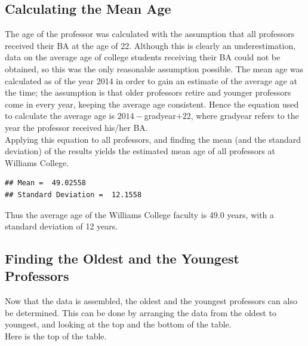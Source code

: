 \documentclass{article}\usepackage[]{graphicx}\usepackage[]{color}
\makeatletter
\newenvironment{kframe}{%
 \def\at@end@of@kframe{}%
 \ifinner\ifhmode%
  \def\at@end@of@kframe{\end{minipage}}%
  \begin{minipage}{\columnwidth}%
 \fi\fi%
 \def\FrameCommand##1{\hskip\@totalleftmargin \hskip-\fboxsep
 \colorbox{shadecolor}{##1}\hskip-\fboxsep
     \hskip-\linewidth \hskip-\@totalleftmargin \hskip\columnwidth}%
 \MakeFramed {\advance\hsize-\width
   \@totalleftmargin\z@ \linewidth\hsize
   \@setminipage}}%
 {\par\unskip\endMakeFramed%
 \at@end@of@kframe}
\newenvironment{knitrout}{}{} %
\makeatother
\begin{document}
\subsection{Calculating the Mean Age}
The age of the professor was calculated with the assumption that all professors received their BA at the
age of 22. Although this is clearly an underestimation, data on the average age of college students receiving
their BA could not be obtained, so this was the only reasonable assumption possible. The mean age was
calculated as of the year 2014 in order to gain an estimate of the average age at the time; the assumption
is that older professors retire and younger professors come in every year, keeping the average age consistent.
Hence the equation used to calculate the average age is $2014 - $gradyear$ + 22$, where gradyear refers to
the year the professor received his/her BA.\\

Applying this equation to all professors, and finding the mean (and the standard deviation) of the results
yields the estimated mean age of all professors at Williams College.

\begin{knitrout}
\color{fgcolor}\begin{kframe}
\begin{verbatim}
## Mean =  49.02558 
## Standard Deviation =  12.1558
\end{verbatim}
\end{kframe}
\end{knitrout}

Thus the average age of the Williams College faculty is 49.0 years, with a standard deviation of 12 years.

\subsection{Finding the Oldest and the Youngest Professors}

Now that the data is assembled, the oldest and the youngest professors can also be determined.
This can be done by arranging the data from the oldest to youngest, and looking at the top and the bottom
of the table. \\

Here is the top of the table.\\
\end{document}
